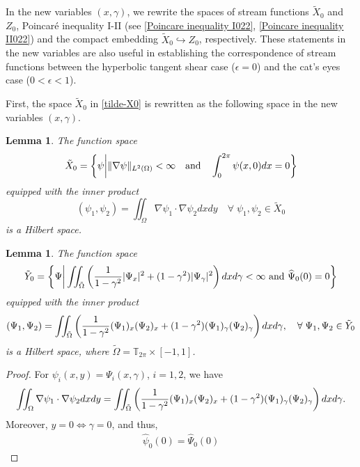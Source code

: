 \documentclass[1 [leqno, 11pt]{amsart}
\numberwithin{equation}{section}
\let\ep=\epsilon
\newtheorem{lemma}[Theorem]{Lemma}
\begin{document}
\begin{CJK*}{GBK}{song}
In the new variables $(x,\gamma)$, we rewrite the spaces of stream functions $\tilde X_0$ and  $Z_{0}$,  Poincar\'e inequality I-II (see \eqref{Poincare inequality I022}, \eqref{Poincare inequality II022}) and the compact embedding   $\tilde X_0\hookrightarrow Z_{0}$, respectively. These statements in the new variables are also useful in establishing the correspondence of stream functions between the hyperbolic tangent shear case ($\ep=0$) and the cat's eyes case ($0<\ep<1$).

First, the space $\tilde X_0$ in \eqref{tilde-X0} is rewritten as the following space in the new variables $(x,\gamma)$.
\begin{lemma}\label{Hilbert}
The function space
\begin{align}\label{tilde-X0}
\tilde{X}_0 = \left\{ \psi \bigg| \|\nabla \psi\|_{L^2(\Omega)} < \infty\quad {\rm{ and }}\quad \int_{0}^{2\pi} \psi(x, 0)d x= 0 \right\}
\end{align} equipped with the inner product $$(\psi_1, \psi_2) = \iint_\Omega \nabla \psi_1 \cdot \nabla \psi_2 dxdy \quad \forall\; \psi_1, \psi_2 \in \tilde{X}_0$$ is a Hilbert space.
\end{lemma}
\fi
\begin{lemma}\label{Hilbert-new variables-0}
The function space
\begin{align}\label{tilde-Y0-def}
\tilde{Y}_0 = \left\{ \Psi\bigg|\iint_{\tilde \Omega}\left({1\over1-\gamma^2}|\Psi_{x}|^2+(1-\gamma^2)|\Psi_{\gamma}|^2\right)d x d\gamma< \infty \text{ and } \widehat{\Psi}_0(0)=0 \right\}
\end{align}
equipped with the inner product $$(\Psi_1, \Psi_2) = \iint_{\tilde{\Omega}}  \left({1\over1-\gamma^2}(\Psi_1)_{x}(\Psi_2)_{x} +(1-\gamma^2)(\Psi_1)_{\gamma}(\Psi_2)_{\gamma}\right)d x d\gamma, \quad \forall\; \Psi_1, \Psi_2 \in \tilde{Y}_0$$ is a Hilbert space, where $\tilde \Omega=\mathbb{T}_{2\pi}\times [-1,1]$.
\end{lemma}
\begin{proof}
For $\psi_i(x,y)=\Psi_i(x,\gamma)$, $i=1,2$, we have
\begin{align}\label{cor-0-new}
\iint_\Omega\nabla \psi_1\cdot\nabla \psi_2dxdy
=\iint_{\tilde \Omega}\left({1\over1-\gamma^2}(\Psi_1)_{x}(\Psi_2)_{x}+(1-\gamma^2)(\Psi_1)_{\gamma}(\Psi_2)_{\gamma}\right)d x d\gamma.
\end{align}
Moreover, $y=0\Longleftrightarrow\gamma=0$, and thus,
\begin{align}\label{0 mode x gamma}
\widehat{\psi}_0(0)=\widehat{\Psi}_0(0)
\end{align}

\end{proof}
\end{CJK*}
\end{document}
